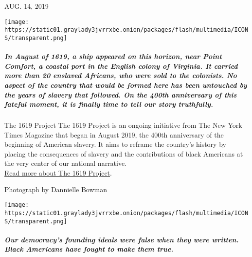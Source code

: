 AUG. 14, 2019

\texttt{[image: https://static01.graylady3jvrrxbe.onion/packages/flash/multimedia/ICONS/transparent.png]}

\hypertarget{in-august-of-1619-a-ship-appeared-on-this-horizon-near-point-comfort-a-coastal-port-in-the-english-colony-of-virginia-it-carried-more-than-20-enslaved-africans-who-were-sold-to-the-colonists-no-aspect-of-the-country-that-would-be-formed-here-has-been-untouched-by-the-years-of-slavery-that-followed-on-the-400th-anniversary-of-this-fateful-moment-it-is-finally-time-to-tell-our-story-truthfully}{%
\subparagraph{In August of 1619, a ship appeared on this horizon, near
Point Comfort, a coastal port in the English colony of Virginia. It
carried more than 20 enslaved Africans, who were sold to the colonists.
No aspect of the country that would be formed here has been untouched by
the years of slavery that followed. On the 400th anniversary of this
fateful moment, it is finally time to tell our story
truthfully.}\label{in-august-of-1619-a-ship-appeared-on-this-horizon-near-point-comfort-a-coastal-port-in-the-english-colony-of-virginia-it-carried-more-than-20-enslaved-africans-who-were-sold-to-the-colonists-no-aspect-of-the-country-that-would-be-formed-here-has-been-untouched-by-the-years-of-slavery-that-followed-on-the-400th-anniversary-of-this-fateful-moment-it-is-finally-time-to-tell-our-story-truthfully}}

The 1619 Project The 1619 Project is an ongoing initiative from The New
York Times Magazine that began in August 2019, the 400th anniversary of
the beginning of American slavery. It aims to reframe the country's
history by placing the consequences of slavery and the contributions of
black Americans at the very center of our national narrative.\\
\href{https://www.nytimes3xbfgragh.onion/interactive/2019/12/20/magazine/1619-intro.html}{Read
more about The 1619 Project}.

Photograph by Dannielle Bowman

\texttt{[image: https://static01.graylady3jvrrxbe.onion/packages/flash/multimedia/ICONS/transparent.png]}

\href{/interactive/2019/08/14/magazine/black-history-american-democracy.html}{}

\hypertarget{our-democracys-founding-ideals-were-false-when-they-were-written-black-americans-have-fought-to-make-them-true}{%
\subparagraph{Our democracy's founding ideals were false when they were
written. Black Americans have fought to make them
true.}\label{our-democracys-founding-ideals-were-false-when-they-were-written-black-americans-have-fought-to-make-them-true}}

